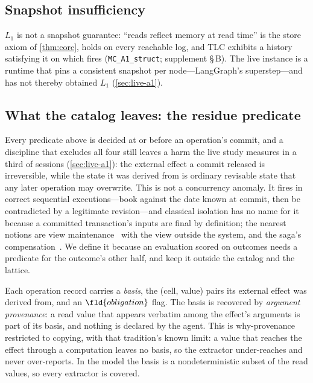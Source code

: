 \subsection{Snapshot insufficiency}
\label{sec:snapshot}
$L_1$ is not a snapshot guarantee: ``reads reflect memory at read time''
is the store axiom of \cref{thm:corc}, holds on every reachable log, and
TLC exhibits a history satisfying it on which  fires
(\texttt{MC\_A1\_struct}; supplement \S\,B). The live instance is a runtime
that pins a consistent snapshot per node---LangGraph's superstep---and has
not thereby obtained $L_1$ (\cref{sec:live-a1}).

\subsection{What the catalog leaves: the residue predicate}
\label{sec:residue}
Every predicate above is decided at or before an operation's commit, and a
discipline that excludes all four still leaves a harm the live study measures
in a third of sessions (\cref{sec:live-a1}): the external effect a commit
released is irreversible, while the state it was derived from is ordinary
revisable state that any later operation may overwrite. This is not a
concurrency anomaly. It fires in correct sequential executions---book
against the date known at commit, then be contradicted by a legitimate
revision---and classical isolation has no name for it because a committed
transaction's inputs are final by definition; the nearest notions are view
maintenance~\cite{GuptaMumick1995ViewMaint} with the view outside the system,
and the saga's compensation~\cite{GarciaMolinaSalem1987Sagas}. We define it because an evaluation scored on outcomes needs a predicate
for the outcome's other half, and keep it outside the catalog and the
lattice.

Each operation record carries a \emph{basis}, the (cell, value) pairs its
external effect was derived from, and an $\fld{obligation}$ flag. The basis
is recovered by \emph{argument provenance}: a read value that appears
verbatim among the effect's arguments is part of its basis, and nothing is
declared by the agent. This is why-provenance~\cite{BunemanEtAl2001Why}
restricted to copying, with that tradition's known limit: a value that
reaches the effect through a computation leaves no basis, so the extractor
under-reaches and never over-reports. In the model the basis is a
nondeterministic subset of the read values, so every extractor is covered.


